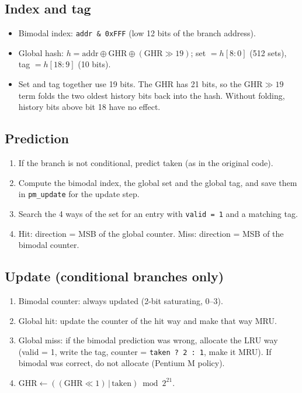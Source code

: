 \documentclass[11pt]{article}
\begin{document}
\subsection{Index and tag}

\begin{itemize}
\item Bimodal index: \texttt{addr \& 0xFFF} (low 12 bits of the branch address).
\item Global hash: $h = \text{addr} \oplus \text{GHR} \oplus (\text{GHR} \gg 19)$;
      set $= h[8{:}0]$ (512 sets), tag $= h[18{:}9]$ (10 bits).
\item Set and tag together use 19 bits. The GHR has 21 bits, so the
      $\text{GHR} \gg 19$ term folds the two oldest history bits back into the
      hash. Without folding, history bits above bit 18 have no effect.
\end{itemize}

\subsection{Prediction}

\begin{enumerate}
\item If the branch is not conditional, predict taken (as in the original code).
\item Compute the bimodal index, the global set and the global tag, and save them
      in \texttt{pm\_update} for the update step.
\item Search the 4 ways of the set for an entry with \texttt{valid = 1} and a
      matching tag.
\item Hit: direction = MSB of the global counter. Miss: direction = MSB of the
      bimodal counter.
\end{enumerate}

\subsection{Update (conditional branches only)}

\begin{enumerate}
\item Bimodal counter: always updated (2-bit saturating, 0--3).
\item Global hit: update the counter of the hit way and make that way MRU.
\item Global miss: if the bimodal prediction was wrong, allocate the LRU way
      (valid = 1, write the tag, counter = \texttt{taken ? 2 : 1}, make it MRU).
      If bimodal was correct, do not allocate (Pentium M policy).
\item $\text{GHR} \leftarrow ((\text{GHR} \ll 1) \,|\, \text{taken}) \bmod 2^{21}$.
\end{enumerate}
\end{document}
